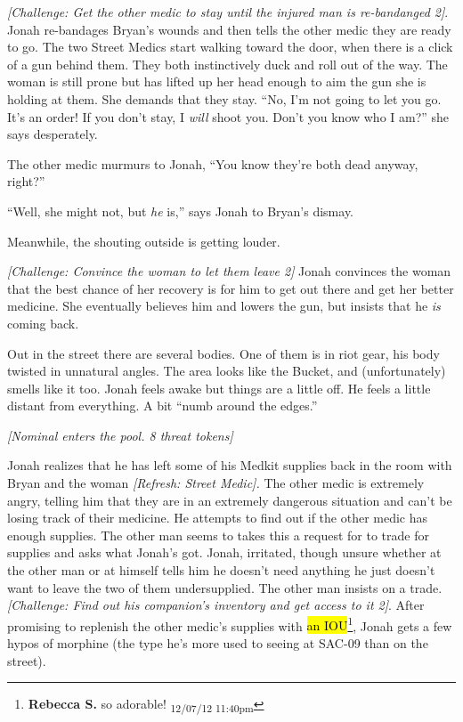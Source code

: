 \textit{{[}Challenge: Get the other medic to stay until the injured man is re-bandanged 2{]}}.  Jonah re-bandages Bryan's wounds and then tells the other medic they are ready to go.  The two Street Medics start walking toward the door, when there is a click of a gun behind them.  They both instinctively duck and roll out of the way.  The woman is still prone but has lifted up her head enough to aim the gun she is holding at them.  She demands that they stay.  ``No, I'm not going to let you go. It's an order!  If you don't stay, I \textit{will} shoot you.  Don't you know who I am?'' she says desperately.



The other medic murmurs to Jonah, ``You know they're both dead anyway, right?''

``Well, she might not, but \textit{he} is,'' says Jonah to Bryan's dismay.



Meanwhile, the shouting outside is getting louder.



\textit{{[}Challenge: Convince the woman to let them leave 2{]}} Jonah convinces the woman that the best chance of her recovery is for him to get out there and get her better medicine.  She eventually believes him and lowers the gun, but insists that he \textit{is} coming back.



Out in the street there are several bodies. One of them is in riot gear, his body twisted in unnatural angles.  The area looks like the Bucket, and (unfortunately) smells like it too. Jonah feels awake but things are a little off.  He feels a little distant from everything.  A bit ``numb around the edges.''



\textit{{[}Nominal enters the pool.  8 threat tokens{]}}



Jonah realizes that he has left some of his Medkit supplies back in the room with Bryan and the woman \textit{{[}Refresh: Street Medic{]}. }  The other medic is extremely angry, telling him that they are in an extremely dangerous situation and can't be losing track of their medicine.  He attempts to find out if the other medic has enough supplies.  The other man seems to takes this a request for to trade for supplies and asks what Jonah's got.  Jonah, irritated, though unsure whether at the other man or at himself tells him he doesn't need anything he just doesn't want to leave the two of them undersupplied.  The other man insists on a trade.  \textit{{[}Challenge: Find out his companion's inventory and get access to it 2{]}}.  After promising to replenish the other medic's supplies with \hl{an IOU}\footnote{\textbf{Rebecca S. }so adorable! \textsubscript{12/07/12 11:40pm}}, Jonah gets a few hypos of morphine (the type he's more used to seeing at SAC-09 than on the street).



